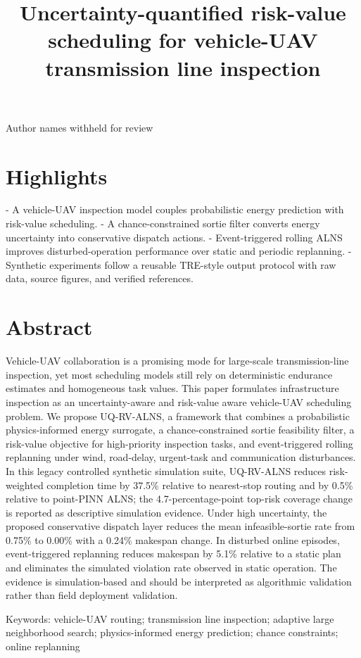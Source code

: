 \documentclass[preprint,12pt]{elsarticle}
\begin{document}
\title{Uncertainty-quantified risk-value scheduling for vehicle-UAV transmission line inspection}

Author names withheld for review

\section{Highlights}

- A vehicle-UAV inspection model couples probabilistic energy prediction with risk-value scheduling.
- A chance-constrained sortie filter converts energy uncertainty into conservative dispatch actions.
- Event-triggered rolling ALNS improves disturbed-operation performance over static and periodic replanning.
- Synthetic experiments follow a reusable TRE-style output protocol with raw data, source figures, and verified references.

\section{Abstract}

Vehicle-UAV collaboration is a promising mode for large-scale transmission-line inspection, yet most scheduling models still rely on deterministic endurance estimates and homogeneous task values. This paper formulates infrastructure inspection as an uncertainty-aware and risk-value aware vehicle-UAV scheduling problem. We propose UQ-RV-ALNS, a framework that combines a probabilistic physics-informed energy surrogate, a chance-constrained sortie feasibility filter, a risk-value objective for high-priority inspection tasks, and event-triggered rolling replanning under wind, road-delay, urgent-task and communication disturbances. In this legacy controlled synthetic simulation suite, UQ-RV-ALNS reduces risk-weighted completion time by 37.5\% relative to nearest-stop routing and by 0.5\% relative to point-PINN ALNS; the 4.7-percentage-point top-risk coverage change is reported as descriptive simulation evidence. Under high uncertainty, the proposed conservative dispatch layer reduces the mean infeasible-sortie rate from 0.75\% to 0.00\% with a 0.24\% makespan change. In disturbed online episodes, event-triggered replanning reduces makespan by 5.1\% relative to a static plan and eliminates the simulated violation rate observed in static operation. The evidence is simulation-based and should be interpreted as algorithmic validation rather than field deployment validation.

Keywords: vehicle-UAV routing; transmission line inspection; adaptive large neighborhood search; physics-informed energy prediction; chance constraints; online replanning
\end{document}
